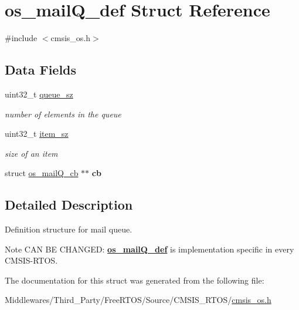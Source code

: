 \hypertarget{structos__mail_q__def}{}\section{os\+\_\+mail\+Q\+\_\+def Struct Reference}
\label{structos__mail_q__def}


{\ttfamily \#include $<$cmsis\+\_\+os.\+h$>$}

\subsection*{Data Fields}
\begin{DoxyCompactItemize}
\item 
\mbox{\label{structos__mail_q__def_a8a83a3a8c0aa8057b13807d2a54077e0}} 
uint32\+\_\+t \mbox{\hyperlink{structos__mail_q__def_a8a83a3a8c0aa8057b13807d2a54077e0}{queue\+\_\+sz}}
\begin{DoxyCompactList}\small\item\em number of elements in the queue \end{DoxyCompactList}\item 
\mbox{\label{structos__mail_q__def_a4c2a0c691de3365c00ecd22d8102811f}} 
uint32\+\_\+t \mbox{\hyperlink{structos__mail_q__def_a4c2a0c691de3365c00ecd22d8102811f}{item\+\_\+sz}}
\begin{DoxyCompactList}\small\item\em size of an item \end{DoxyCompactList}\item 
\mbox{\label{structos__mail_q__def_a1845aa4e1d8758da92a5017211d09394}} 
struct \mbox{\hyperlink{structos__mail_q__cb}{os\+\_\+mail\+Q\+\_\+cb}} $\ast$$\ast$ {\bfseries cb}
\end{DoxyCompactItemize}


\subsection{Detailed Description}
Definition structure for mail queue. \begin{DoxyNote}{Note}
C\+AN BE C\+H\+A\+N\+G\+ED\+: {\bfseries \mbox{\hyperlink{structos__mail_q__def}{os\+\_\+mail\+Q\+\_\+def}}} is implementation specific in every C\+M\+S\+I\+S-\/\+R\+T\+OS. 
\end{DoxyNote}


The documentation for this struct was generated from the following file\+:\begin{DoxyCompactItemize}
\item 
Middlewares/\+Third\+\_\+\+Party/\+Free\+R\+T\+O\+S/\+Source/\+C\+M\+S\+I\+S\+\_\+\+R\+T\+O\+S/\mbox{\hyperlink{cmsis__os_8h}{cmsis\+\_\+os.\+h}}\end{DoxyCompactItemize}
